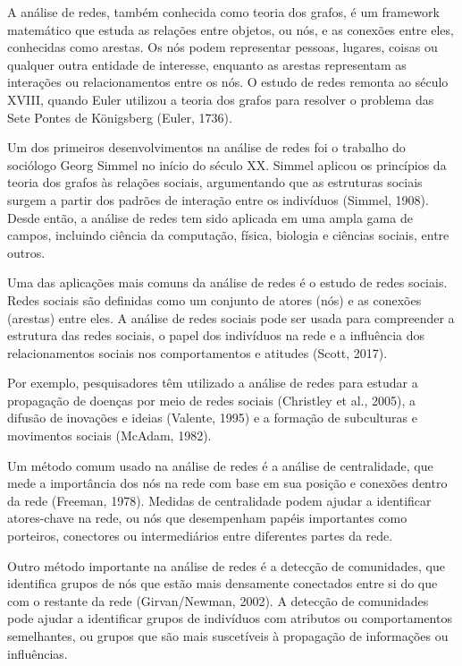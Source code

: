 A análise de redes, também conhecida como teoria dos grafos, é um framework matemático que estuda as relações entre objetos, ou nós, e as conexões entre eles, conhecidas como arestas. Os nós podem representar pessoas, lugares, coisas ou qualquer outra entidade de interesse, enquanto as arestas representam as interações ou relacionamentos entre os nós. O estudo de redes remonta ao século XVIII, quando Euler utilizou a teoria dos grafos para resolver o problema das Sete Pontes de Königsberg (Euler, 1736).

Um dos primeiros desenvolvimentos na análise de redes foi o trabalho do sociólogo Georg Simmel no início do século XX. Simmel aplicou os princípios da teoria dos grafos às relações sociais, argumentando que as estruturas sociais surgem a partir dos padrões de interação entre os indivíduos (Simmel, 1908). Desde então, a análise de redes tem sido aplicada em uma ampla gama de campos, incluindo ciência da computação, física, biologia e ciências sociais, entre outros.

Uma das aplicações mais comuns da análise de redes é o estudo de redes sociais. Redes sociais são definidas como um conjunto de atores (nós) e as conexões (arestas) entre eles. A análise de redes sociais pode ser usada para compreender a estrutura das redes sociais, o papel dos indivíduos na rede e a influência dos relacionamentos sociais nos comportamentos e atitudes (Scott, 2017).

Por exemplo, pesquisadores têm utilizado a análise de redes para estudar a propagação de doenças por meio de redes sociais (Christley et al., 2005), a difusão de inovações e ideias (Valente, 1995) e a formação de subculturas e movimentos sociais (McAdam, 1982).

Um método comum usado na análise de redes é a análise de centralidade, que mede a importância dos nós na rede com base em sua posição e conexões dentro da rede (Freeman, 1978). Medidas de centralidade podem ajudar a identificar atores-chave na rede, ou nós que desempenham papéis importantes como porteiros, conectores ou intermediários entre diferentes partes da rede.

Outro método importante na análise de redes é a detecção de comunidades, que identifica grupos de nós que estão mais densamente conectados entre si do que com o restante da rede (Girvan/Newman, 2002). A detecção de comunidades pode ajudar a identificar grupos de indivíduos com atributos ou comportamentos semelhantes, ou grupos que são mais suscetíveis à propagação de informações ou influências.

